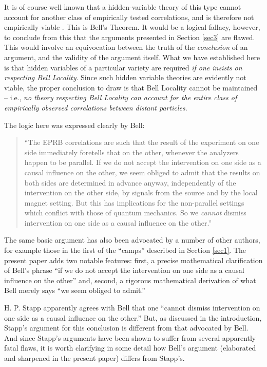 \documentclass[aps,prc,onecolumn,12pt]{revtex4-2}
\begin{document}
It is of course well known that a hidden-variable theory of this type
cannot account for another class of empirically tested
correlations, and is therefore not empirically viable \cite{aspect}.
This is Bell's
Theorem.  It would be a logical fallacy, however, to conclude from
this that the arguments presented in Section \ref{sec3} are flawed.
This would involve an equivocation between the truth of the \emph{conclusion}
of an argument, and the validity of the argument itself.  What we
have established here is that hidden variables of a particular variety
are required \emph{if one insists on respecting Bell Locality}.  Since
such hidden variable theories are evidently not viable, the proper conclusion
to draw is that Bell Locality cannot be maintained -- i.e., \emph{no theory
respecting Bell Locality can account for the entire class of
empirically observed correlations between distant particles}.

The logic here was expressed clearly by Bell:
\begin{quote}
``The EPRB correlations are such that the result of the
experiment on one side immediately foretells that on the other,
whenever the analyzers happen to be parallel.  If we do not accept the
intervention on one side as a causal influence on the other, we seem
obliged to admit that the results on both sides are determined in
advance anyway, independently of the intervention on the other side,
by signals from the source and by the local magnet setting.  But
this has implications for the non-parallel settings which
conflict with those of quantum mechanics.  So we \emph{cannot} dismiss
intervention on one side as a causal influence on the other.''
\cite[pg 149-50]{bell}
\end{quote}
The same basic argument has also been advocated by a number of other
authors, for example those in the first
of the ``camps'' described in Section \ref{sec1}.  The present paper adds two
notable features:  first, a precise mathematical clarification of
Bell's phrase ``if we do not accept the intervention on one side as
a causal influence on the other'' and, second, a rigorous mathematical
derivation of what Bell merely says ``we seem obliged to admit.''

H. P. Stapp apparently agrees with Bell that one ``cannot dismiss
intervention on one side as a causal influence on the other.''
But, as discussed in the introduction, Stapp's argument
for this conclusion is different from that advocated by Bell.
And since Stapp's arguments have been shown to suffer
from several apparently fatal flaws, it is worth clarifying in some
detail how Bell's argument (elaborated and sharpened in the present
paper) differs from Stapp's.
\end{document}
